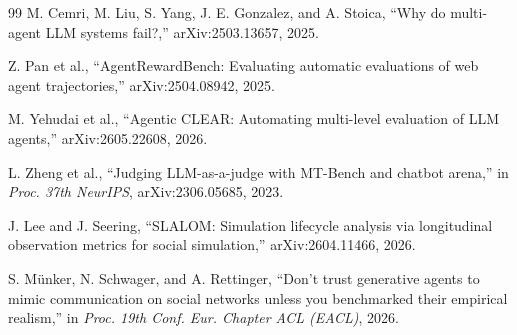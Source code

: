 \documentclass[11pt]{article}
\begin{document}
\begin{thebibliography}{99}
M. Cemri, M. Liu, S. Yang, J. E. Gonzalez, and A. Stoica, ``Why do multi-agent LLM systems fail?,'' arXiv:2503.13657, 2025.

Z. Pan et al., ``AgentRewardBench: Evaluating automatic evaluations of web agent trajectories,'' arXiv:2504.08942, 2025.

M. Yehudai et al., ``Agentic CLEAR: Automating multi-level evaluation of LLM agents,'' arXiv:2605.22608, 2026.

L. Zheng et al., ``Judging LLM-as-a-judge with MT-Bench and chatbot arena,'' in \emph{Proc. 37th NeurIPS}, arXiv:2306.05685, 2023.

J. Lee and J. Seering, ``SLALOM: Simulation lifecycle analysis via longitudinal observation metrics for social simulation,'' arXiv:2604.11466, 2026.

S. M\"{u}nker, N. Schwager, and A. Rettinger, ``Don't trust generative agents to mimic communication on social networks unless you benchmarked their empirical realism,'' in \emph{Proc. 19th Conf. Eur. Chapter ACL (EACL)}, 2026.

\end{thebibliography}
\end{document}
